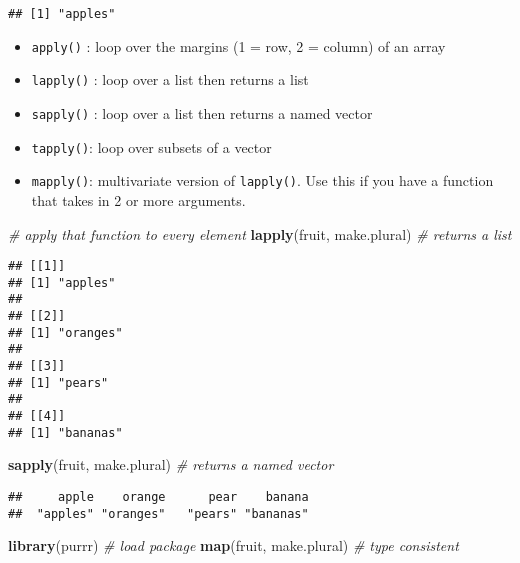 \documentclass[
]{book}
\newenvironment{Shaded}{\begin{snugshade}}{\end{snugshade}}
\newcommand{\CommentTok}[1]{\textcolor[rgb]{0.56,0.35,0.01}{\textit{#1}}}
\newcommand{\KeywordTok}[1]{\textcolor[rgb]{0.13,0.29,0.53}{\textbf{#1}}}
\newcommand{\NormalTok}[1]{#1}
\providecommand{\tightlist}{%
  \setlength{\itemsep}{0pt}\setlength{\parskip}{0pt}}
\begin{document}
\begin{verbatim}
## [1] "apples"
\end{verbatim}

\begin{itemize}
\tightlist
\item
  \texttt{apply()} : loop over the margins (1 = row, 2 = column) of an array
\item
  \texttt{lapply()} : loop over a list then returns a list
\item
  \texttt{sapply()} : loop over a list then returns a named vector
\item
  \texttt{tapply()}: loop over subsets of a vector
\item
  \texttt{mapply()}: multivariate version of \texttt{lapply()}. Use this if you have a function that takes in 2 or more arguments.
\end{itemize}

\begin{Shaded}
\begin{Highlighting}[]
\CommentTok{\# apply that function to every element}
\KeywordTok{lapply}\NormalTok{(fruit, make.plural) }\CommentTok{\# returns a list}
\end{Highlighting}
\end{Shaded}

\begin{verbatim}
## [[1]]
## [1] "apples"
## 
## [[2]]
## [1] "oranges"
## 
## [[3]]
## [1] "pears"
## 
## [[4]]
## [1] "bananas"
\end{verbatim}

\begin{Shaded}
\begin{Highlighting}[]
\KeywordTok{sapply}\NormalTok{(fruit, make.plural) }\CommentTok{\# returns a named vector}
\end{Highlighting}
\end{Shaded}

\begin{verbatim}
##     apple    orange      pear    banana 
##  "apples" "oranges"   "pears" "bananas"
\end{verbatim}

\begin{Shaded}
\begin{Highlighting}[]
\KeywordTok{library}\NormalTok{(purrr) }\CommentTok{\# load package}
\KeywordTok{map}\NormalTok{(fruit, make.plural) }\CommentTok{\# type consistent}
\end{Highlighting}
\end{Shaded}
\end{document}
